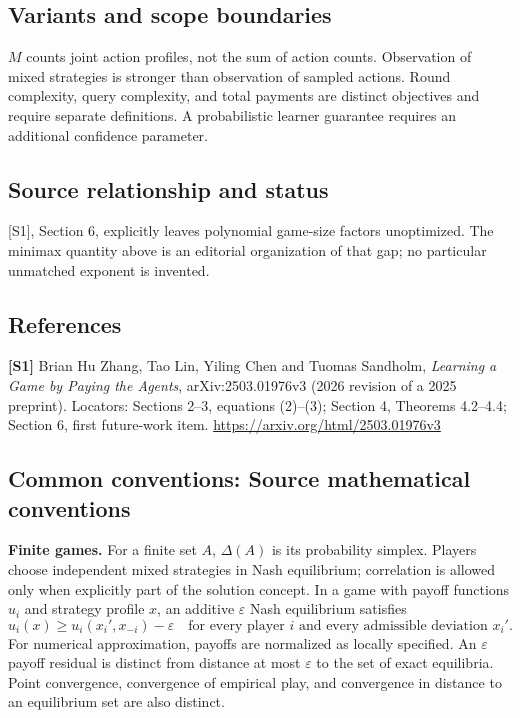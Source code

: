 \documentclass[11pt,a4paper]{article}
\begin{document}
\subsection*{Variants and scope boundaries}
$M$ counts joint action profiles, not the sum of action counts. Observation of mixed strategies is stronger than observation of sampled actions. Round complexity, query complexity, and total payments are distinct objectives and require separate definitions. A probabilistic learner guarantee requires an additional confidence parameter.
\subsection*{Source relationship and status}
[S1], Section 6, explicitly leaves polynomial game-size factors unoptimized. The minimax quantity above is an editorial organization of that gap; no particular unmatched exponent is invented.
\subsection*{References}
\begingroup\footnotesize\raggedright
\textbf{[S1]} Brian Hu Zhang, Tao Lin, Yiling Chen and Tuomas Sandholm, \emph{Learning a Game by Paying the Agents}, arXiv:2503.01976v3 (2026 revision of a 2025 preprint). Locators: Sections 2--3, equations (2)--(3); Section 4, Theorems 4.2--4.4; Section 6, first future-work item. \url{https://arxiv.org/html/2503.01976v3}
\par\endgroup

\subsection*{Common conventions: Source mathematical conventions}

\textbf{Finite games.} For a finite set $A$, $\Delta(A)$ is its probability
simplex. Players choose independent mixed strategies in Nash equilibrium;
correlation is allowed only when explicitly part of the solution concept.
In a game with payoff functions $u_i$ and strategy profile $x$, an additive
$\varepsilon$ Nash equilibrium satisfies
\[
 u_i(x)\geq u_i(x_i',x_{-i})-\varepsilon
 \quad\text{for every player $i$ and every admissible deviation $x_i'$}.
\]
For numerical approximation, payoffs are normalized as locally specified.
An $\varepsilon$ payoff residual is distinct from distance at most
$\varepsilon$ to the set of exact equilibria. Point convergence, convergence
of empirical play, and convergence in distance to an equilibrium set are
also distinct.
\end{document}
